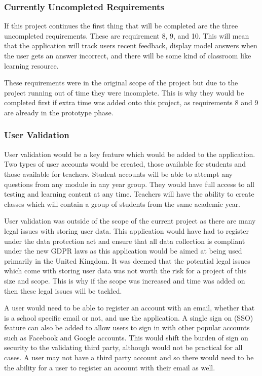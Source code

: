 \documentclass{article}
\begin{document}
\subsubsection{Currently Uncompleted Requirements}

If this project continues the first thing that will be completed are the three uncompleted requirements. These are requirement 8, 9, and 10. This will mean that the application will track users recent feedback, display model answers when the user gets an answer incorrect, and there will be some kind of classroom like learning resource. \par

These requirements were in the original scope of the project but due to the project running out of time they were incomplete. This is why they would be completed first if extra time was added onto this project, as requirements 8 and 9 are already in the prototype phase. 

\subsubsection{User Validation}

User validation would be a key feature which would be added to the application. Two types of user accounts would be created, those available for students and those available for teachers. Student accounts will be able to attempt any questions from any module in any year group. They would have full access to all testing and learning content at any time. Teachers will have the ability to create classes which will contain a group of students from the same academic year. \par

User validation was outside of the scope of the current project as there are many legal issues with storing user data. This application would have had to register under the data protection act and ensure that all data collection is compliant under the new GDPR laws as this application would be aimed at being used primarily in the United Kingdom. It was deemed that the potential legal issues which come with storing user data was not worth the risk for a project of this size and scope. This is why if the scope was increased and time was added on then these legal issues will be tackled. \par

A user would need to be able to register an account with an email, whether that is a school specific email or not, and use the application. A single sign on (SSO) feature can also be added to allow users to sign in with other popular accounts such as Facebook and Google accounts. This would shift the burden of sign on security to the validating third party, although would not be practical for all cases. A user may not have a third party account and so there would need to be the ability for a user to register an account with their email as well. \par
\end{document}
